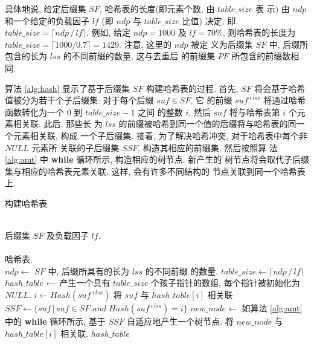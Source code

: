 \documentclass{ws-ijprai}
\begin{document}
具体地说, 给定后缀集 $SF$, 哈希表的长度(即元素个数, 由 $table\_size$ 表
示) 由 $ndp$ 和一个给定的负载因子 $lf$
(即 $ndp$ 与 $table\_size$ 比值) 决定, 即.
$table\_size = \lceil ndp\,/\,lf \rceil$. 例如, 给定 $ndp =
1000$ 及 $lf = 70\%$, 则哈希表的长度为
$table\_size = \lceil 1000/0.7 \rceil = 1429$. 注意, 这里的 $ndp$ 被定
义为后缀集 $SF$ 中, 后缀所包含的长为 $lss$ 的不同前缀的数量, 这与去重后
的前缀集 $PF$ 所包含的前缀数相同.

算法 \ref{alg:hash} 显示了基于后缀集 $SF$ 构建哈希表的过程.  首先,
$SF$ 将会基于哈希值被分为若干个子后缀集: 对于每个后缀 $suf \in SF$, 它
的前缀 $suf^{+lss}$ 将通过哈希函数转化为一个 0 到 $table\_size-1$ 之间
的整数 $i$, 然后 $suf$ 将与哈希表第 $i$ 个元素相关联. 此后, 那些长
为 $lss$ 的前缀被哈希到同一个值的后缀将与哈希表的同一个元素相关联, 构成
一个子后缀集. 接着, 为了解决哈希冲突, 对于哈希表中每个非 $NULL$ 元素所
关联的子后缀集 $SSF$, 构造其相应的前缀集, 然后按照算
法 \ref{alg:amt} 中 \textbf{while} 循环所示, 构造相应的树节点. 新产生的
树节点将会取代子后缀集与相应的哈希表元素关联. 这样, 会有许多不同结构的
节点关联到同一个哈希表上.



\begin{algorithm}
  \caption{构建哈希表}\scriptsize
  \label{alg:hash}
  \begin{algorithmic}[1]
    \REQUIRE ~~\\
    后缀集 $SF$ 及负载因子 $lf$. \\
    \ENSURE ~~\\
    哈希表.\\
    \STATE
    \STATE $ndp \leftarrow$ $SF$ 中, 后缀所具有的长为 $lss$ 的不同前缀
    的数量.
    \STATE $table\_size \leftarrow \lceil ndp\,/\,lf \rceil$
    \STATE $hash\_table \leftarrow$ 产生一个具有
    $table\_size$ 个孩子指针的数组, 每个指针被初始化为 $NULL$.
    \STATE
    \STATE $i \leftarrow Hash(suf^{+lss})$
    \STATE 将 $suf$ 与 $hash\_table[i]$ 相关联
    \ENDFOR
    \STATE
    \STATE $SSF \leftarrow \{suf\,|\,suf\in SF\; and\; Hash(suf^{+lss})=i\}$
    \STATE $new\_node \leftarrow$ 如算法 \ref{alg:amt} 中的
    \textbf{while} 循环所示, 基于 $SSF$ 自适应地产生一个树节点.
    \STATE 将 $new\_node$ 与 $hash\_table[i]$ 相关联.
    \ENDIF
    \ENDFOR
    \STATE
    \RETURN $hash\_table$
  \end{algorithmic}
\end{algorithm}
\end{document}
